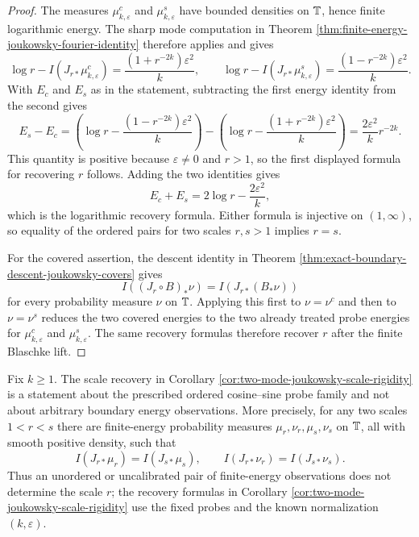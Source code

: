 \begin{proof}
The measures \(\mu^c_{k,\varepsilon}\) and \(\mu^s_{k,\varepsilon}\) have bounded densities on \(\mathbb{T}\), hence finite logarithmic energy.  The sharp mode computation in Theorem \ref{thm:finite-energy-joukowsky-fourier-identity} therefore applies and gives
\[
\log r-I(J_{r\ast}\mu^c_{k,\varepsilon})=\frac{(1+r^{-2k})\varepsilon^2}{k},
\qquad
\log r-I(J_{r\ast}\mu^s_{k,\varepsilon})=\frac{(1-r^{-2k})\varepsilon^2}{k}.
\]
With \(E_c\) and \(E_s\) as in the statement, subtracting the first energy identity from the second gives
\[
E_s-E_c=
\left(\log r-\frac{(1-r^{-2k})\varepsilon^2}{k}\right)
-
\left(\log r-\frac{(1+r^{-2k})\varepsilon^2}{k}\right)
=\frac{2\varepsilon^2}{k}r^{-2k}.
\]
This quantity is positive because \(\varepsilon\ne0\) and \(r>1\), so the first displayed formula for recovering \(r\) follows.  Adding the two identities gives
\[
E_c+E_s=2\log r-\frac{2\varepsilon^2}{k},
\]
which is the logarithmic recovery formula.  Either formula is injective on \((1,\infty)\), so equality of the ordered pairs for two scales \(r,s>1\) implies \(r=s\).

For the covered assertion, the descent identity in Theorem \ref{thm:exact-boundary-descent-joukowsky-covers} gives
\[
I((J_r\circ B)_\ast\nu)=I(J_{r\ast}(B_\ast\nu))
\]
for every probability measure \(\nu\) on \(\mathbb{T}\).  Applying this first to \(\nu=\nu^c\) and then to \(\nu=\nu^s\) reduces the two covered energies to the two already treated probe energies for \(\mu^c_{k,\varepsilon}\) and \(\mu^s_{k,\varepsilon}\).  The same recovery formulas therefore recover \(r\) after the finite Blaschke lift.
\end{proof}

\begin{proposition}\label{prop:two-mode-calibration-necessary}
Fix \(k\ge1\).  The scale recovery in Corollary
\ref{cor:two-mode-joukowsky-scale-rigidity} is a statement about the
prescribed ordered cosine--sine probe family and not about arbitrary
boundary energy observations.  More precisely, for any two scales
\(1<r<s\) there are finite-energy probability measures
\(\mu_r,\nu_r,\mu_s,\nu_s\) on \(\mathbb{T}\), all with smooth positive
density, such that
\[
I(J_{r\ast}\mu_r)=I(J_{s\ast}\mu_s),
\qquad
I(J_{r\ast}\nu_r)=I(J_{s\ast}\nu_s).
\]
Thus an unordered or uncalibrated pair of finite-energy observations
does not determine the scale \(r\); the recovery formulas in Corollary
\ref{cor:two-mode-joukowsky-scale-rigidity} use the fixed probes and
the known normalization \((k,\varepsilon)\).
\end{proposition}

